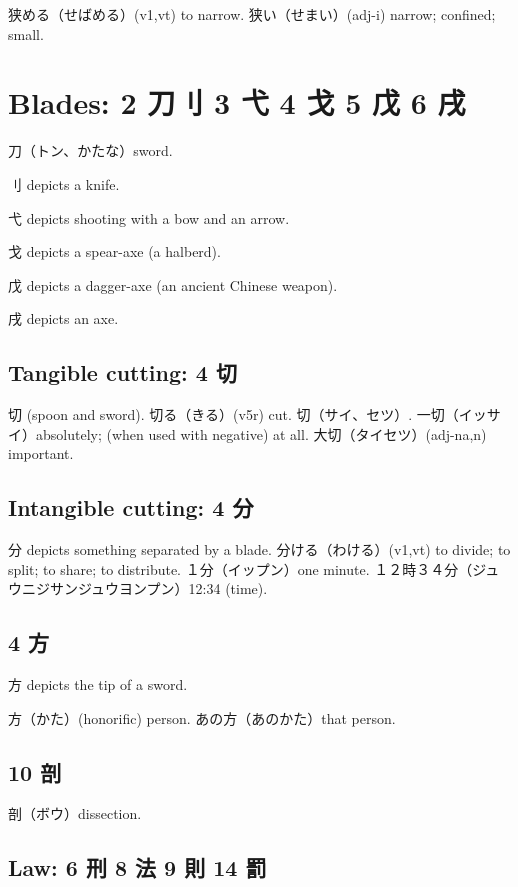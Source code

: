 狭める（せばめる）(v1,vt) to narrow.
狭い（せまい）(adj-i) narrow; confined; small.

\section{Blades: 2 刀刂 3 弋 4 戈 5 戊 6 戌}

刀（トン、かたな）sword.

刂 depicts a knife.

弋 depicts shooting with a bow and an arrow.

戈 depicts a spear-axe (a halberd).

戊 depicts a dagger-axe (an ancient Chinese weapon).

戌 depicts an axe.

\subsection{Tangible cutting: 4 切}

切 (spoon and sword).
切る（きる）(v5r) cut.
切（サイ、セツ）.
一切（イッサイ）absolutely; (when used with negative) at all.
大切（タイセツ）(adj-na,n) important.

\subsection{Intangible cutting: 4 分}

分 depicts something separated by a blade.
分ける（わける）(v1,vt) to divide; to split; to share; to distribute.
１分（イップン）one minute.
１２時３４分（ジュウニジサンジュウヨンプン）12:34 (time).

\subsection{4 方}

方 depicts the tip of a sword.

方（かた）(honorific) person.
あの方（あのかた）that person.

\subsection{10 剖}

剖（ボウ）dissection.

\subsection{Law: 6 刑 8 法 9 則 14 罰}

